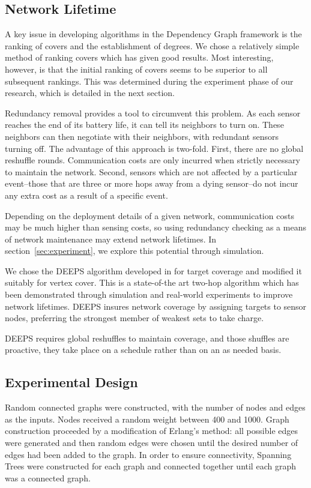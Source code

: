 \subsection{Network Lifetime}

A key issue in developing algorithms in the Dependency Graph framework is the ranking of covers and the establishment of degrees. We chose a relatively simple method of ranking covers which has given good results. Most interesting, however, is that the initial ranking of covers seems to be superior to all subsequent rankings. This was determined during the experiment phase of our research, which is detailed in the next section.

Redundancy removal provides a tool to circumvent this problem. As each sensor reaches the end of its battery life, it can tell its neighbors to turn on. These neighbors can then negotiate with their neighbors, with redundant sensors turning off. The advantage of this approach is two-fold. First, there are no global reshuffle rounds. Communication costs are only incurred when strictly necessary to maintain the network. Second, sensors which are not affected by a particular event--those that are three or more hops away from a dying sensor--do not incur any extra cost as a result of a specific event.

Depending on the deployment details of a given network, communication costs may be much higher than sensing costs, so using redundancy checking as a means of network maintenance may extend network lifetimes. In section~\ref{sec:experiment}, we explore this potential through simulation.

We chose the DEEPS algorithm developed in \cite{1640702}for target coverage and modified it suitably for vertex cover. This is a state-of-the art two-hop algorithm which has been demonstrated through simulation and real-world experiments to improve network lifetimes. DEEPS insures network coverage by assigning targets to sensor nodes, preferring the strongest member of weakest sets to take charge. 

DEEPS requires global reshuffles to maintain coverage, and those shuffles are proactive, they take place on a schedule rather than on an as needed basis.

\subsection{Experimental Design}
\label{sub:exp-design}
Random connected graphs were constructed, with the number of nodes and edges as the inputs. Nodes received a random weight between 400 and 1000. Graph construction proceeded by a modification of Erlang's method: all possible edges were generated and then random edges were chosen until the desired number of edges had been added to the graph. In order to ensure connectivity, Spanning Trees were constructed for each graph and connected together until each graph was a connected graph. 

